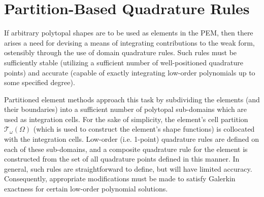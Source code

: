 

\section{Partition-Based Quadrature Rules} \label{sec:quadrature}

		
If arbitrary polytopal shapes are to be used as elements in the PEM, then there arises a need for devising a means of integrating contributions to the weak form, ostensibly through the use of domain quadrature rules. Such rules must be sufficiently stable (utilizing a sufficient number of well-positioned quadrature points) and accurate (capable of exactly integrating low-order polynomials up to some specified degree).
	
Partitioned element methods approach this task by subdividing the elements (and their boundaries) into a sufficient number of polytopal sub-domains which are used as integration cells. For the sake of simplicity, the element's cell partition $\mathcal{T}_\omega (\Omega)$ (which is used to construct the element's shape functions) is collocated with the integration cells. Low-order (i.e. 1-point) quadrature rules are defined on each of these sub-domains, and a composite quadrature rule for the element is constructed from the set of all quadrature points defined in this manner. In general, such rules are straightforward to define, but will have limited accuracy. Consequently, appropriate modifications must be made to satisfy Galerkin exactness for certain low-order polynomial solutions.
	
